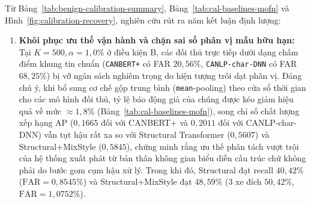 \documentclass[12pt, a4paper, reqno, oneside]{book}
\DeclareRobustCommand{\code}[1]{\nolinkurl{#1}}
\begin{document}
Từ Bảng~\ref{tab:benign-calibration-summary}, Bảng~\ref{tab:cal-baselines-mofn} và Hình~\ref{fig:calibration-recovery}, nghiên cứu rút ra năm kết luận định lượng:
\begin{enumerate}
    \item \textbf{Khôi phục ưu thế vận hành và chặn sai số phân vị mẫu hữu hạn:} Tại $K=500, \alpha=1{,}0\%$ ở điều kiện B, các đối thủ trực tiếp dưới dạng chấm điểm khung tin chuẩn (\code{CANBERT+} có FAR $20{,}56\%$, \code{CANLP-char-DNN} có FAR $68{,}25\%$) bị vỡ ngân sách nghiêm trọng do hiện tượng trôi dạt phân vị. Đáng chú ý, khi bổ sung cơ chế gộp trung bình (\code{mean}-pooling) theo cửa sổ thời gian cho các mô hình đối thủ, tỷ lệ báo động giả của chúng được kéo giảm hiệu quả về mức $\approx 1{,}8\%$ (Bảng~\ref{tab:cal-baselines-mofn}), song chỉ số chất lượng xếp hạng AP ($0{,}1665$ đối với CANBERT+ và $0{,}2011$ đối với CANLP-char-DNN) vẫn tụt hậu rất xa so với Structural Transformer ($0{,}5607$) và Structural+MixStyle ($0{,}5845$), chứng minh rằng ưu thế phân tách vượt trội của hệ thống xuất phát từ bản thân không gian biểu diễn cấu trúc chứ không phải do bước gom cụm hậu xử lý. Trong khi đó, Structural đạt recall $40{,}42\%$ ($\text{FAR}=0{,}8545\%$) và Structural+MixStyle đạt $48{,}59\%$ (3 xe đích $50{,}42\%$, $\text{FAR}=1{,}0752\%$).


\end{enumerate}
\end{document}
